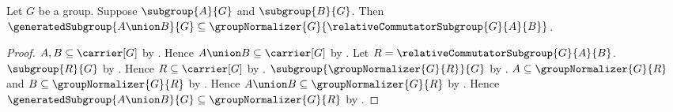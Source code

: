 \begin{theorem}\label{generated_join_normalizes_relative_commutator}
    Let $G$ be a group.
    Suppose $\subgroup{A}{G}$ and $\subgroup{B}{G}$.
    Then
        $\generatedSubgroup{A\union B}{G}\subseteq
            \groupNormalizer{G}{
                \relativeCommutatorSubgroup{G}{A}{B}}$.
\end{theorem}
\begin{proof}
    $A,B\subseteq\carrier[G]$ by .
    Hence $A\union B\subseteq\carrier[G]$ by
        .
    Let $R=\relativeCommutatorSubgroup{G}{A}{B}$.
    $\subgroup{R}{G}$ by
        .
    Hence $R\subseteq\carrier[G]$ by .
    $\subgroup{\groupNormalizer{G}{R}}{G}$ by
        .
    $A\subseteq\groupNormalizer{G}{R}$ and
        $B\subseteq\groupNormalizer{G}{R}$ by
        .
    Hence $A\union B\subseteq\groupNormalizer{G}{R}$ by
        .
    Hence
        $\generatedSubgroup{A\union B}{G}\subseteq
            \groupNormalizer{G}{R}$ by
        .
\end{proof}

